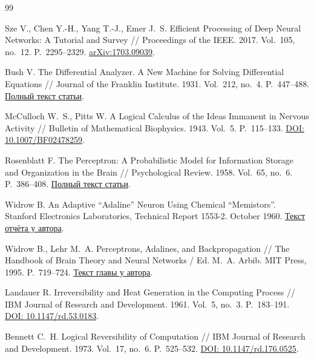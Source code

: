 \begingroup
\singlespacing
\fontsize{12}{14.4}\selectfont
\RaggedRight
{}
\begin{thebibliography}{99}

Sze V., Chen Y.-H., Yang T.-J., Emer J.~S.
Efficient Processing of Deep Neural Networks: A Tutorial and Survey //
Proceedings of the IEEE. 2017. Vol.~105, no.~12. P.~2295--2329.
\href{https://arxiv.org/abs/1703.09039}{arXiv:1703.09039}.

Bush V.
The Differential Analyzer. A New Machine for Solving Differential Equations //
Journal of the Franklin Institute. 1931. Vol.~212, no.~4. P.~447--488.
\href{https://fab.cba.mit.edu/classes/862.22/notes/computation/Bush-1931.pdf}{Полный текст статьи}.

McCulloch W.~S., Pitts W.
A Logical Calculus of the Ideas Immanent in Nervous Activity //
Bulletin of Mathematical Biophysics. 1943. Vol.~5. P.~115--133.
\href{https://doi.org/10.1007/BF02478259}{DOI: 10.1007/BF02478259}.

Rosenblatt F.
The Perceptron: A Probabilistic Model for Information Storage and
Organization in the Brain // Psychological Review. 1958.
Vol.~65, no.~6. P.~386--408.
\href{https://www.cs.cmu.edu/~epxing/Class/10715/reading/Rosenblatt.perceptron.pdf}{Полный текст статьи}.

Widrow B.
An Adaptive ``Adaline'' Neuron Using Chemical ``Memistors''.
Stanford Electronics Laboratories, Technical Report 1553-2. October 1960.
\href{https://isl.stanford.edu/~widrow/papers/t1960anadaptive.pdf}{Текст отчёта у автора}.

Widrow B., Lehr M.~A.
Perceptrons, Adalines, and Backpropagation //
The Handbook of Brain Theory and Neural Networks / Ed. M.~A. Arbib.
MIT Press, 1995. P.~719--724.
\href{https://www-isl.stanford.edu/~widrow/papers/bc1995perceptronsadalines.pdf}{Текст главы у автора}.

Landauer R.
Irreversibility and Heat Generation in the Computing Process //
IBM Journal of Research and Development. 1961. Vol.~5, no.~3. P.~183--191.
\href{https://doi.org/10.1147/rd.53.0183}{DOI: 10.1147/rd.53.0183}.

Bennett C.~H.
Logical Reversibility of Computation //
IBM Journal of Research and Development. 1973. Vol.~17, no.~6. P.~525--532.
\href{https://doi.org/10.1147/rd.176.0525}{DOI: 10.1147/rd.176.0525}.


\end{thebibliography}
